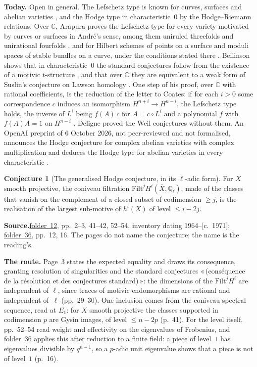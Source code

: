 \documentclass[11pt]{article}
\newcommand{\q}[1]{«\,#1\,»}
\newcommand{\fac}[1]{\href{https://grothendieck.umontpellier.fr/#1.pdf}{folder~#1}}
\theoremstyle{definition}
\theoremstyle{plain}\newtheorem*{proposition}{Proposition}\theoremstyle{definition}
\newtheorem{bigconj}{Conjecture}
\newcommand{\entry}[1]{\par\medskip\noindent\textbf{#1}\enspace}
\newcommand{\src}[1]{\entry{Source.}#1}
\begin{document}
\entry{Today.} Open in general. The Lefschetz type is known for curves, surfaces and abelian varieties \cite{kleiman1968}, and the Hodge type in characteristic~$0$ by the Hodge--Riemann relations. Over $\mathbb C$, Arapura proves the Lefschetz type for every variety motivated by curves or surfaces in André's sense, among them uniruled threefolds and unirational fourfolds \cite[Cor.~4.3]{arapura}, and for Hilbert schemes of points on a surface and moduli spaces of stable bundles on a curve, under the conditions stated there \cite[Cor.~7.2, 7.5]{arapura}. Beilinson shows that in characteristic~$0$ the standard conjectures follow from the existence of a motivic $t$-structure \cite[\S1.4--1.5]{beilinson}, and that over $\mathbb C$ they are equivalent to a weak form of Suslin's conjecture on Lawson homology \cite[\S2.2, Prop.]{beilinson}. One step of his proof, over $\mathbb C$ with rational coefficients, is the reduction of the letter to Coates: if for each $i > 0$ some correspondence $c$ induces an isomorphism $H^{n+i} \to H^{n-i}$, the Lefschetz type holds, the inverse of $L^i$ being $f(A)\,c$ for $A = c \circ L^i$ and a polynomial $f$ with $f(A)A = 1$ on $H^{n-i}$ \cite[\S2.3, proof of (b)]{beilinson}. Deligne proved the Weil conjectures without them. An OpenAI preprint of 6 October 2026, not peer-reviewed and not formalised, announces the Hodge conjecture for complex abelian varieties with complex multiplication and deduces the Hodge type for abelian varieties in every characteristic \cite{openaimath}.

\begin{bigconj}[The generalised Hodge conjecture, in its $\ell$-adic form]\label{c:hodge}
For $X$ smooth projective, the coniveau filtration $\mathrm{Filt}^j H^i(\bar X, \mathbb Q_\ell)$, made of the classes that vanish on the complement of a closed subset of codimension $\ge j$, is the realisation of the largest sub-motive of $h^i(X)$ of level $\le i - 2j$.
\end{bigconj}

\src{\fac{12}, pp.~2--3, 41--42, 52--54, inventory dating 1964--[c.~1971]; \fac{36}, pp.~12, 16. The pages do not name the conjecture; the name is the reading's.}

\entry{The route.} Page~3 states the expected equality and draws its consequence, granting resolution of singularities and the standard conjectures \q{(conséquence de la résolution et des conjectures standard)}: the dimensions of the $\mathrm{Filt}^j H^i$ are independent of $\ell$, since traces of motivic endomorphisms are rational and independent of~$\ell$ (pp.~29--30). One inclusion comes from the coniveau spectral sequence, read at $E_1$: for $X$ smooth projective the classes supported in codimension $p$ are Gysin images, of level $\le n - 2p$ (p.~41). For the level itself, pp.~52--54 read weight and effectivity on the eigenvalues of Frobenius, and folder~36 applies this after reduction to a finite field: a piece of level~$1$ has eigenvalues divisible by $q^{n-1}$, so a $p$-adic unit eigenvalue shows that a piece is not of level~$1$ (p.~16).
\end{document}
